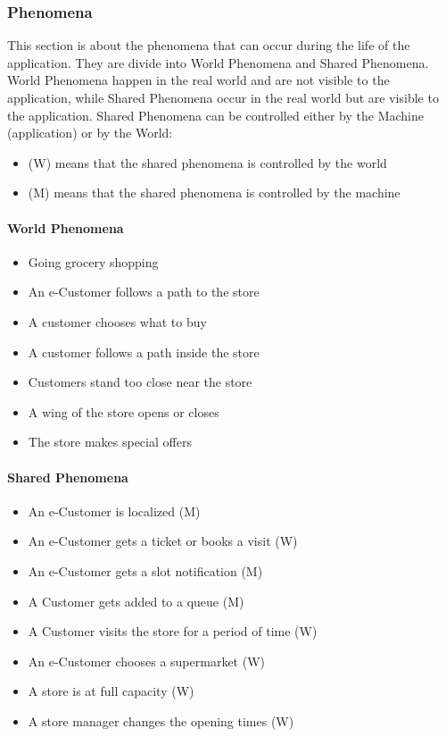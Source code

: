 
\subsubsection{Phenomena}
This section is about the phenomena that can occur during the life of the application. They are divide into World Phenomena and Shared Phenomena\textsuperscript{\cite{worldmachine}}. World Phenomena happen in the real world and are not visible to the application, while Shared Phenomena occur in the real world but are visible to the application. Shared Phenomena can be controlled either by the Machine (application) or by the World:

\begin{itemize}[itemsep=-1mm, topsep=-1mm]
	\item (W) means that the shared phenomena is controlled by the world
	\item (M) means that the shared phenomena is controlled by the machine
\end{itemize}

\paragraph{World Phenomena}
\begin{itemize}[itemsep=-1mm, topsep=-1mm]
	\item Going grocery shopping
	\item An e-Customer follows a path to the store
	\item A customer chooses what to buy
	\item A customer follows a path inside the store
	\item Customers stand too close near the store
	\item A wing of the store opens or closes
	\item The store makes special offers
\end{itemize}

\paragraph{Shared Phenomena}
\begin{itemize}[itemsep=-1mm, topsep=-1mm]
	\item An e-Customer is localized (M)
	\item An e-Customer gets a ticket or books a visit (W)
	\item An e-Customer gets a slot notification (M)
	\item A Customer gets added to a queue (M)
	\item A Customer visits the store for a period of time (W)
	\item An e-Customer chooses a supermarket (W)
	\item A store is at full capacity (W)
	\item A store manager changes the opening times (W)
\end{itemize}